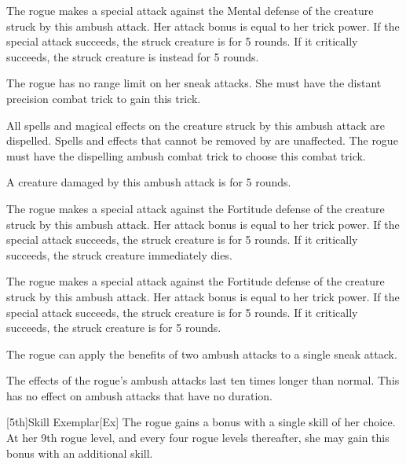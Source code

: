 The rogue makes a special attack against the Mental defense of the creature struck by this ambush attack.
Her attack bonus is equal to her trick power.
If the special attack succeeds, the struck creature is \disoriented for 5 rounds.
If it critically succeeds, the struck creature is instead \confused for 5 rounds.

The rogue has no range limit on her sneak attacks.
She must have the distant precision combat trick to gain this trick.

All spells and magical effects on the creature struck by this ambush attack are dispelled.
Spells and effects that cannot be removed by  are unaffected.
The rogue must have the dispelling ambush combat trick to choose this combat trick.

A creature damaged by this ambush attack is \dazed for 5 rounds.

The rogue makes a special attack against the Fortitude defense of the creature struck by this ambush attack.
Her attack bonus is equal to her trick power.
If the special attack succeeds, the struck creature is \staggered for 5 rounds.
If it critically succeeds, the struck creature immediately dies.

The rogue makes a special attack against the Fortitude defense of the creature struck by this ambush attack.
Her attack bonus is equal to her trick power.
If the special attack succeeds, the struck creature is \staggered for 5 rounds.
If it critically succeeds, the struck creature is \paralyzed for 5 rounds.


The rogue can apply the benefits of two ambush attacks to a single sneak attack.

The effects of the rogue's ambush attacks last ten times longer than normal.
This has no effect on ambush attacks that have no duration.

[5th]{Skill Exemplar}[Ex]
The rogue gains a  bonus with a single skill of her choice.
At her 9th rogue level, and every four rogue levels thereafter, she may gain this bonus with an additional skill.

